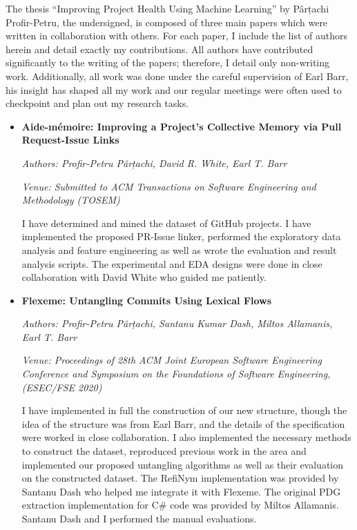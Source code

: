 The thesis “Improving Project Health Using Machine Learning” by Pârțachi
Profir-Petru, the undersigned, is composed of three main papers which were
written in collaboration with others. For each paper, I include the list of
authors herein and detail exactly my contributions. All authors have contributed
significantly to the writing of the papers; therefore, I detail only non-writing
work. Additionally, all work was done under the careful supervision of Earl
Barr, his insight has shaped all my work and our regular meetings were often
used to checkpoint and plan out my research tasks.

\begin{itemize}[leftmargin=*]
    \item[] \textbf{Aide-mémoire: Improving a Project’s Collective Memory via
Pull Request-Issue Links} 
    
    \noindent\emph{Authors: Profir-Petru Pârțachi, David R. White, Earl T. Barr}
    
    \noindent\emph{Venue: Submitted to ACM Transactions on Software Engineering
    and Methodology (TOSEM)}

    \noindent I have determined and mined the dataset of GitHub projects. I have
    implemented the proposed PR-Issue linker, performed the exploratory data
    analysis and feature engineering as well as wrote the evaluation and result
    analysis scripts. The experimental and EDA designs were done in close
    collaboration with David White who guided me patiently.

    \item[] \noindent\textbf{Flexeme: Untangling Commits Using Lexical Flows}
    
    \noindent\emph{Authors: Profir-Petru Pârțachi, Santanu Kumar Dash, Miltos
    Allamanis, Earl T. Barr}
    
    \noindent\emph{Venue: Proceedings of 28th ACM Joint European Software
    Engineering Conference and Symposium on the Foundations of Software
    Engineering, (ESEC/FSE 2020)}

    \noindent  I have implemented in full the construction of our new structure,
    though the idea of the structure was from Earl Barr, and the details of the
    specification were worked in close collaboration. I also implemented the
    necessary methods to construct the dataset, reproduced previous work in the
    area and implemented our proposed untangling algorithms as well as their
    evaluation on the constructed dataset. The RefiNym implementation was
    provided by Santanu Dash who helped me integrate it with Flexeme. The
    original PDG extraction implementation for C\# code was provided by Miltos
    Allamanis. Santanu Dash and I performed the manual evaluations.
    

\end{itemize}
